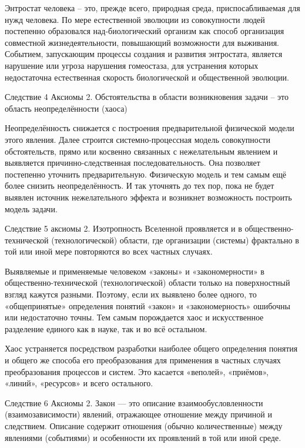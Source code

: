 \documentclass[11pt,a4paper]{article}
\begin{document}
Энтростат человека – это, прежде всего, природная среда, приспосабливаемая для нужд человека. По мере естественной эволюции из совокупности людей постепенно образовался над-биологический организм как способ организация совместной жизнедеятельности, повышающий возможности для выживания. Событием, запускающим процессы создания и развития энтростата, является нарушение или угроза нарушения гомеостаза, для устранения которых недостаточна естественная скорость биологической и общественной эволюции.

 

Следствие 4 Аксиомы 2. Обстоятельства в области возникновения задачи – это область неопределённости (хаоса)

Неопределённость снижается с построения предварительной физической модели этого явления. Далее строится системно-процессная модель совокупности обстоятельств, прямо или косвенно связанных с нежелательным явлением и выявляется причинно-следственная последовательность. Она позволяет постепенно уточнить предварительную. Физическую модель и тем самым ещё более снизить неопределённость. И так уточнять до тех пор, пока не будет выявлен источник нежелательного эффекта и возникнет возможность построить модель задачи.

 

Следствие 5 аксиомы 2. Изотропность Вселенной проявляется и в общественно-технической (технологической) области, где организации (системы) фрактально в той или иной мере повторяются во всех частных случаях.

Выявляемые и применяемые человеком «законы» и «закономерности» в общественно-технической (технологической) области только на поверхностный взгляд кажутся разными. Поэтому, если их выявлено более одного, то «общепринятые» определения понятий «закон» и «закономерность» ошибочны или недостаточно точны. Тем самым порождается хаос и искусственное разделение единого как в науке, так и во всё остальном.

 Хаос устраняется посредством разработки наиболее общего определения понятия и общего же способа его преобразования для применения в частных случаях преобразования процессов и систем. Это касается «веполей», «приёмов», «линий», «ресурсов» и всего остального.

 

Следствие 6 Аксиомы 2. Закон — это описание взаимообусловленности (взаимозависимости) явлений, отражающее отношение между причиной и следствием. Описание содержит отношения (обычно количественные) между явлениями (событиями) и особенности их проявлений в той или иной среде.
\end{document}
